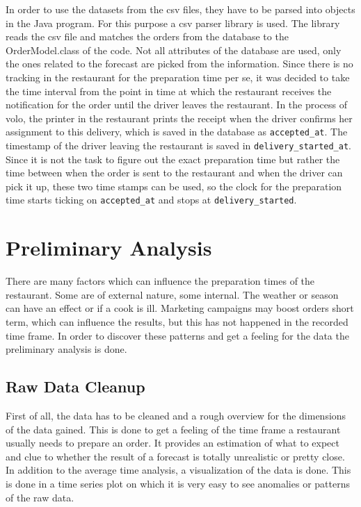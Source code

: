 In order to use the datasets from the csv files, they have to be parsed into objects in the Java program. For this purpose a csv parser library is used. The library reads the csv file and matches the orders from the database to the OrderModel.class of the code. Not all attributes of the database are used, only the ones related to the forecast are picked from the information. Since there is no tracking in the restaurant for the preparation time per se, it was decided to take the time interval from the point in time at which the restaurant receives the notification for the order until the driver leaves the restaurant. In the process of volo, the printer in the restaurant prints the receipt when the driver confirms her assignment to this delivery, which is saved in the database as \texttt{accepted\_at}. The timestamp of the driver leaving the restaurant is saved in \texttt{delivery\_started\_at}. Since it is not the task to figure out the exact preparation time but rather the time between when the order is sent to the restaurant and when the driver can pick it up,  these two time stamps can be used, so the clock for the preparation time starts ticking on \texttt{accepted\_at} and stops at \texttt{delivery\_started}.
\section{Preliminary Analysis}\label{section:Preliminary Analysis}
There are many factors which can influence the preparation times of the restaurant. Some are of external nature, some internal. The weather or season can have an effect or if a cook is ill.\newline
Marketing campaigns may boost orders short term, which can influence the results, but this has not happened in the recorded time frame.\newline
In order to discover these patterns and get a feeling for the data the preliminary analysis is done.
\subsection{Raw Data Cleanup}\label{subsection:Raw Data Cleanup}
First of all, the data has to be cleaned and a rough overview for the dimensions of the data gained. This is done to get a feeling of the time frame a restaurant usually needs to prepare an order. It provides an estimation of what to expect and clue to whether the result of a forecast is totally unrealistic or pretty close. In addition to the average time analysis, a visualization of the data is done. This is done in a time series plot on which it is very easy to see anomalies or patterns of the raw data.\newline

